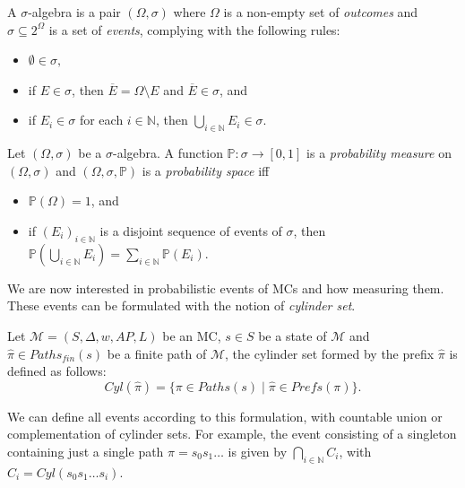 \begin{definition}
  A $\sigma$-algebra is a pair $(\Omega, \sigma)$ where $\Omega$ is a non-empty set of \textit{outcomes} and $\sigma \subseteq 2^\Omega$ is a set of \textit{events}, complying with the following rules:
  \begin{itemize}
    \item $\emptyset \in \sigma,$
    \item if $E \in \sigma$, then $\overline{E} = \Omega \setminus E$ and $\overline{E} \in \sigma$, and
    \item if $E_i \in \sigma$ for each $i \in \mathbb{N}$, then $\bigcup_{i \in \mathbb{N}} E_i \in \sigma$.
  \end{itemize}
\end{definition}
\begin{definition}
  Let $(\Omega, \sigma)$ be a $\sigma$-algebra. A function $\mathbb{P}: \sigma \rightarrow [0, 1]$ is a \textit{probability measure} on $(\Omega, \sigma)$ and $(\Omega, \sigma, \mathbb{P})$ is a \textit{probability space} iff
  \begin{itemize}
    \item $\mathbb{P}(\Omega) = 1$, and
    \item if $(E_i)_{i \in \mathbb{N}}$ is a disjoint sequence of events of $\sigma$, then $\mathbb{P}(\bigcup_{i \in \mathbb{N}}E_i) = \sum_{i\in \mathbb{N}}\mathbb{P}(E_i)$.
  \end{itemize}
\end{definition}

We are now interested in probabilistic events of MCs and how measuring them. These events can be formulated with the notion of \textit{cylinder set}.

\begin{definition}
Let $\mathcal{M} = (S, \Delta, w, AP, L)$ be an MC, $s \in S$ be a state of $\mathcal{M}$ and $\hat{\pi} \in Paths_{fin}(s)$ be a finite path of $\mathcal{M}$,
the cylinder set formed by the prefix $\hat{\pi}$ is defined as follows:
\[Cyl(\hat{\pi})=\{\pi\in Paths(s)\;|\;\hat{\pi}\in Prefs(\pi) \}. \]
\end{definition}

We can define all events according to this formulation,
with countable union or complementation of cylinder sets. For example, the event consisting of a singleton containing just a single path $\pi = s_0s_1\dots$ is given by $\bigcap_{i \in \mathbb{N}} C_i$, with $C_i = Cyl(s_0s_1\dots s_i)$.

